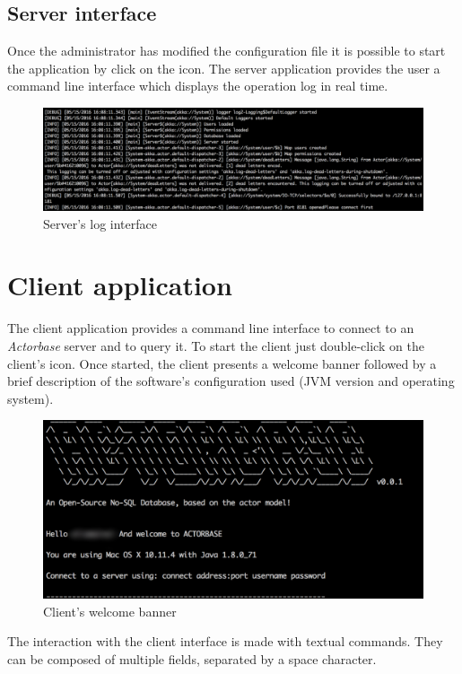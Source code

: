 \documentclass[a4paper]{article}
\begin{document}
	\subsection{Server interface}
	Once the administrator has modified the configuration file it is possible to start the application by click on the icon. The server application provides the user a command line interface which displays the operation log in real time.
	\begin{figure}[H]
		\centering
		\includegraphics[width=\textwidth]{logServer.png}
		\caption{Server's log interface}
	\end{figure}
	\newpage
	

	\section{Client application}
	The client application provides a command line interface to connect to an \emph{Actorbase} server and to query it. To start the client just double-click on the client's icon. Once started, the client presents a welcome banner followed by a brief description of the software's configuration used (JVM version and operating system).
	\begin{figure}[H]
		\centering
		\includegraphics[width=\textwidth]{welcomeClient.png}
		\caption{Client's welcome banner}
	\end{figure}
	The interaction with the client interface is made with textual commands. They can be composed of multiple fields, separated by a space character.
	
\end{document}
